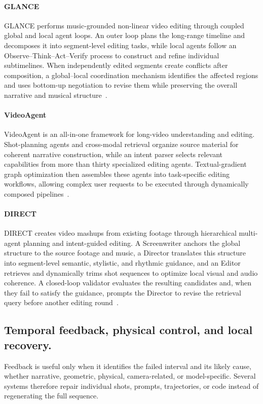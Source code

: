 \paragraph{GLANCE}
GLANCE performs music-grounded non-linear video editing through coupled global and local agent loops. An outer loop plans the long-range timeline and decomposes it into segment-level editing tasks, while local agents follow an Observe--Think--Act--Verify process to construct and refine individual subtimelines. When independently edited segments create conflicts after composition, a global--local coordination mechanism identifies the affected regions and uses bottom-up negotiation to revise them while preserving the overall narrative and musical structure~\cite{avg260405076}.

\paragraph{VideoAgent}
VideoAgent is an all-in-one framework for long-video understanding and editing. Shot-planning agents and cross-modal retrieval organize source material for coherent narrative construction, while an intent parser selects relevant capabilities from more than thirty specialized editing agents. Textual-gradient graph optimization then assembles these agents into task-specific editing workflows, allowing complex user requests to be executed through dynamically composed pipelines~\cite{avg260623327}.

\paragraph{DIRECT}
DIRECT creates video mashups from existing footage through hierarchical multi-agent planning and intent-guided editing. A Screenwriter anchors the global structure to the source footage and music, a Director translates this structure into segment-level semantic, stylistic, and rhythmic guidance, and an Editor retrieves and dynamically trims shot sequences to optimize local visual and audio coherence. A closed-loop validator evaluates the resulting candidates and, when they fail to satisfy the guidance, prompts the Director to revise the retrieval query before another editing round~\cite{avg260404875}.

\subsection{Temporal feedback, physical control, and local recovery.}
Feedback is useful only when it identifies the failed interval and its likely cause, whether narrative, geometric, physical, camera-related, or model-specific. Several systems therefore repair individual shots, prompts, trajectories, or code instead of regenerating the full sequence.

